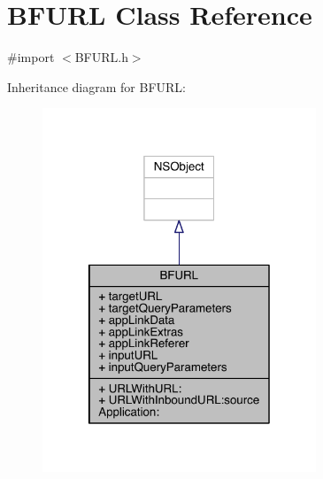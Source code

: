 \hypertarget{interface_b_f_u_r_l}{\section{B\-F\-U\-R\-L Class Reference}
\label{interface_b_f_u_r_l}
}


{\ttfamily \#import $<$B\-F\-U\-R\-L.\-h$>$}



Inheritance diagram for B\-F\-U\-R\-L\-:
\nopagebreak
\begin{figure}[H]
\begin{center}
\leavevmode
\includegraphics[width=232pt]{interface_b_f_u_r_l__inherit__graph}
\end{center}
\end{figure}


